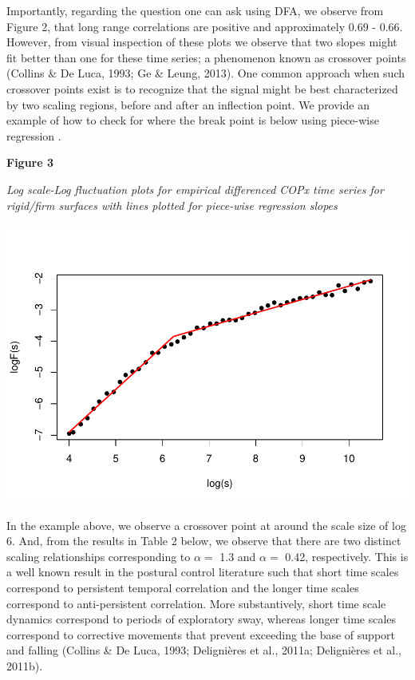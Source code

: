 \documentclass[
  man]{apa6}
\begin{document}
Importantly, regarding the question one can ask using DFA, we observe
from Figure 2, that long range correlations are positive and
approximately 0.69 -
0.66. However, from visual inspection of
these plots we observe that two slopes might fit better than one for
these time series; a phenomenon known as crossover points (Collins \& De Luca, 1993; Ge \& Leung, 2013). One common approach when such crossover points exist is to
recognize that the signal might be best characterized by two scaling
regions, before and after an inflection point. We provide an example of
how to check for where the break point is below using piece-wise
regression .

\textbf{Figure 3}

\emph{Log scale-Log fluctuation plots for empirical differenced COPx time
series for rigid/firm surfaces with lines plotted for piece-wise
regression slopes}

\includegraphics{fractal_regression_paper_brm_files/figure-latex/unnamed-chunk-7-1.pdf}

In the example above, we observe a crossover point at around the scale
size of log 6. And, from the results in Table 2 below, we observe that
there are two distinct scaling relationships corresponding to \(\alpha =\)
1.3 and \(\alpha =\) 0.42, respectively. This is a well known result in
the postural control literature such that short time scales correspond
to persistent temporal correlation and the longer time scales correspond
to anti-persistent correlation. More substantively, short time scale
dynamics correspond to periods of exploratory sway, whereas longer time
scales correspond to corrective movements that prevent exceeding the
base of support and falling (Collins \& De Luca, 1993; Delignières et al., 2011a; Delignières et al., 2011b).
\end{document}
